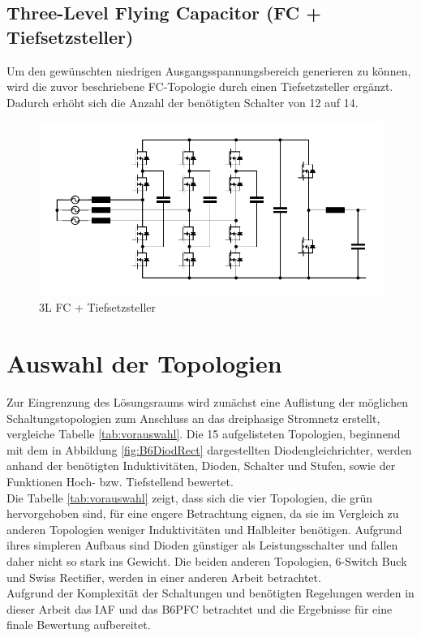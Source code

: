 	
	\subsection{Three-Level Flying Capacitor (FC + Tiefsetzsteller)}
		Um den gewünschten niedrigen Ausgangsspannungsbereich generieren zu können, wird die zuvor beschriebene FC-Topologie durch einen Tiefsetzsteller ergänzt. Dadurch erhöht sich die Anzahl der benötigten Schalter von 12 auf 14.
		\begin{figure}[H]
			\centering
			\includegraphics[width=0.9\linewidth]{content/Grafiken/3L-FC-Boost+Buck}
			\caption{3L FC + Tiefsetzsteller}
			\label{fig:3l-fc-boostbuck}
		\end{figure}

\section{Auswahl der Topologien}
Zur Eingrenzung des Lösungsraums wird zunächst eine Auflistung der möglichen Schaltungstopologien zum Anschluss an das dreiphasige Stromnetz erstellt, vergleiche Tabelle \ref{tab:vorauswahl}. Die 15 aufgelisteten Topologien, beginnend mit dem in Abbildung \ref{fig:B6DiodRect} dargestellten Diodengleichrichter, werden anhand der benötigten Induktivitäten, Dioden, Schalter und Stufen, sowie der Funktionen Hoch- bzw. Tiefstellend bewertet.\\
Die Tabelle \ref{tab:vorauswahl} zeigt, dass sich die vier Topologien, die grün hervorgehoben sind, für eine engere Betrachtung eignen, da sie im Vergleich zu anderen Topologien weniger Induktivitäten und Halbleiter benötigen. Aufgrund ihres simpleren Aufbaus sind Dioden günstiger als Leistungsschalter und fallen daher nicht so stark ins Gewicht. Die beiden anderen Topologien, 6-Switch Buck und Swiss Rectifier, werden in einer anderen Arbeit betrachtet.\\
Aufgrund der Komplexität der Schaltungen und benötigten Regelungen werden in dieser Arbeit das IAF und das B6PFC betrachtet und die Ergebnisse für eine finale Bewertung aufbereitet.

